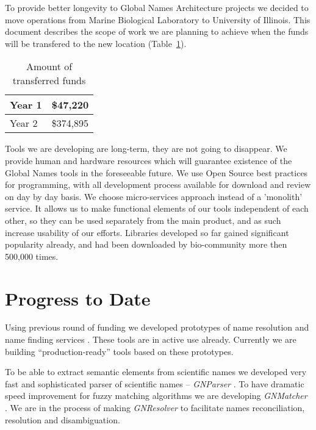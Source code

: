 \documentclass[11pt]{article}
\begin{document}
To provide better longevity to Global Names Architecture projects we decided to
move operations from Marine Biological Laboratory to University of Illinois.
This document describes the scope of work we are planning to achieve when the
funds will be transfered to the new location (Table~\ref{table:funds}).

\begin{table}[!htb]
  \begin{center}
    \caption{Amount of transferred funds}
    \label{table:funds}
    \vspace{0.4cm}
    \begin{tabular}{| l | r |}
      \hline
      Year 1 & \$47,220 \\
      \hline
      Year 2 & \$374,895 \\
      \hline
    \end{tabular}
  \end{center}
\end{table}

Tools we are developing are long-term, they are not going to disappear. We
provide human and hardware resources which will guarantee existence of the
Global Names tools in the foreseeable future. We use Open Source best practices
for programming, with all development process available for download and review
on day by day basis. We choose micro-services approach instead of a 'monolith'
service.  It allows us to make functional elements of our tools independent of
each other, so they can be used separately from the main product, and as such
increase usability of our efforts. Libraries developed so far gained
significant popularity already, and had been downloaded by bio-community more
then 500,000 times.

\section{Progress to Date}

Using previous round of funding \cite{gn-nsf-2011} we developed prototypes of
name resolution \cite{resolver:gn} and name finding services \cite{gnrd}. These
tools are in active use already. Currently we are building ``production-ready''
tools based on these prototypes.

To be able to extract semantic elements from scientific names we developed very
fast and sophisticated parser of scientific names -- \textit{GNParser}
\cite{gnparser}. To have dramatic speed improvement for fuzzy matching
algorithms we are developing \textit{GNMatcher} \cite{gnmatcher}. We are in the
process of making \textit{GNResolver} \cite{gnresolver} to facilitate names
reconciliation, resolution and disambiguation.
\end{document}
